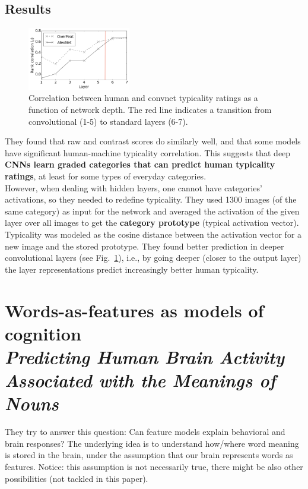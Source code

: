 \subsection{Results}
\begin{figure}
  \centering
  \includegraphics[width=0.4\textwidth]{images/lake.png}
  \caption{Correlation between human and convnet typicality ratings as a function of network depth. The red line indicates a transition from convolutional (1-5) to standard layers (6-7).}
  \label{fig:lake}
\end{figure}

They found that raw and contrast scores do similarly well, and that some models have significant human-machine typicality correlation. This suggests that deep \textbf{CNNs learn graded categories that can predict human typicality ratings}, at least for some types of everyday categories.\\

However, when dealing with hidden layers, one cannot have categories' activations, so they needed to redefine typicality.
They used 1300 images (of the same category) as input for the network and averaged the activation of the given layer over all images to get the \textbf{category prototype} (typical activation vector).
Typicality was modeled as the cosine distance between the activation vector for a new image and the stored prototype. They found better prediction in deeper convolutional layers (see Fig.~\ref{fig:lake}), i.e., by going deeper (closer to the output layer) the layer representations predict increasingly better human typicality.


\section[Words-as-features as models of cognition]{Words-as-features as models of cognition\\ \large{\textit{Predicting Human Brain Activity Associated with the Meanings of Nouns}\\ }}
They try to answer this question: Can feature models explain behavioral and brain responses?
The underlying idea is to understand how/where word meaning is stored in the brain, under the assumption that our brain represents words as features. Notice: this assumption is not necessarily true, there might be also other possibilities (not tackled in this paper).

